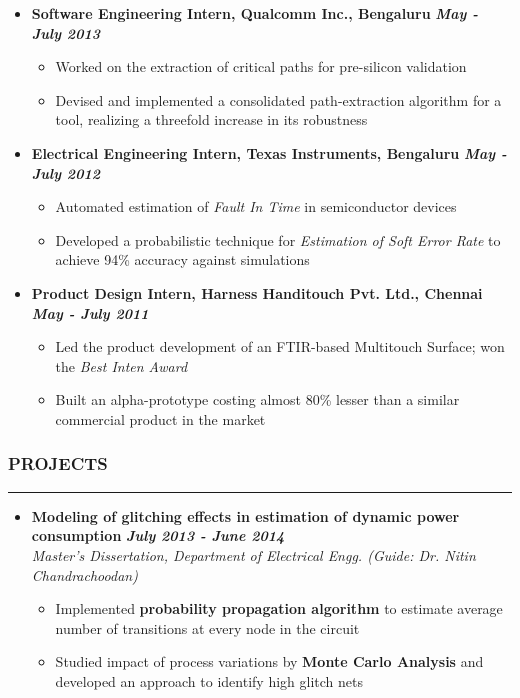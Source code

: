 \documentclass[10pt,a4paper,English]{article}
\newcommand\roottitle[1]{\vspace{-4mm}\subsubsection*{\uppercase{#1}}\vspace{-0.3em}\nopagebreak[4]\hrule\vspace{4mm}}
\newcommand\itemyear[1]{\hfill \textbf{\emph{\color{itemyear} #1}}}
\newcommand\itemenv{\setlength\itemsep{0.5pt} \addtolength{\itemindent}{-5mm}\vspace{-1.5mm}}
\begin{document}
\begin{itemize}
    \item \textbf{Software Engineering Intern, Qualcomm Inc., Bengaluru} \itemyear{May - July 2013}
        \begin{itemize} \itemenv
            \item Worked on the extraction of critical paths for pre-silicon validation
            \item Devised and implemented a consolidated path-extraction algorithm for a tool, realizing a threefold increase in its robustness
        \end{itemize}

    \item \textbf{Electrical Engineering Intern, Texas Instruments, Bengaluru } \itemyear{May - July 2012}
        \begin{itemize} \itemenv
            \item Automated estimation of \textit{Fault In Time} in semiconductor devices
            \item Developed a probabilistic technique for \emph{Estimation of Soft Error Rate} to achieve 94\% accuracy against simulations
        \end{itemize}

    \item \textbf{Product Design Intern, Harness Handitouch Pvt. Ltd., Chennai } \itemyear{May - July 2011}
        \begin{itemize} \itemenv
            \item Led the product development of an FTIR-based Multitouch Surface; won the \textit{Best Inten Award}
            \item Built an alpha-prototype costing almost 80\% lesser than a similar commercial product in the market
        \end{itemize}

    \end{itemize}

\roottitle{Projects}
\begin{itemize} \itemenv
    \item \textbf{Modeling of glitching effects in estimation of dynamic power consumption} \hfill \itemyear{July 2013 - June 2014} \\
    \emph{Master's Dissertation, Department of Electrical Engg. (Guide: Dr. Nitin Chandrachoodan)}
        \begin{itemize} \itemenv
            \item Implemented \textbf{probability propagation algorithm} to estimate average number of transitions at every node in the circuit
            \item Studied impact of process variations by \textbf{Monte Carlo Analysis} and developed an approach to identify high glitch nets
        \end{itemize}
\end{itemize}
\end{document}
